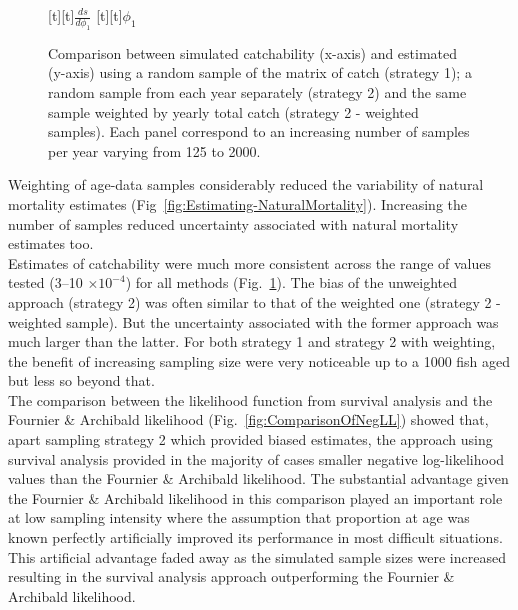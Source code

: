 \documentclass[12pt]{article}
\begin{document}
\begin{figure}
[t][t]{{\protect\large $\displaystyle\frac{ds}{d\phi_1}$}}
[t][t]{{\protect\Large $\phi_1$}}
\centering
{}
\vspace{2cm}
\caption{Comparison between simulated catchability (x-axis) and estimated (y-axis) using a random sample of the matrix of catch (strategy 1); a random sample from each year separately (strategy 2) and the same sample weighted by yearly total catch (strategy 2 - weighted samples). Each panel correspond to an increasing number of samples per year varying from 125 to 2000.}
\label{fig:Estimating-Catchability}
\end{figure}

Weighting of age-data samples considerably reduced the variability of natural mortality estimates (Fig~\ref{fig:Estimating-NaturalMortality}). Increasing the number of samples reduced uncertainty associated with natural mortality estimates too. \\ 

Estimates of catchability were much more consistent across the range of values tested (3--10 $ \times 10^{-4}$) for all methods (Fig.~\ref{fig:Estimating-Catchability}). The bias of the unweighted approach (strategy 2) was often similar to that of the weighted one (strategy 2 - weighted sample). But the uncertainty associated with the former approach was much larger than the latter. For both strategy 1 and strategy 2 with weighting, the benefit of increasing sampling size were very noticeable up to a 1000 fish aged but less so beyond that.\\

The comparison between the likelihood function from survival analysis and the Fournier \& Archibald likelihood (Fig.~\ref{fig:ComparisonOfNegLL}) showed that, apart sampling strategy 2 which provided biased estimates, the approach using survival analysis provided in the majority of cases smaller negative log-likelihood values than the Fournier \& Archibald likelihood. The substantial advantage given the Fournier \& Archibald likelihood in this comparison played an important role at low sampling intensity where the assumption that proportion at age was known perfectly artificially improved its performance in most difficult situations. This artificial advantage faded away as the simulated sample sizes were increased resulting in the survival analysis approach outperforming the Fournier \& Archibald likelihood. \\
\end{document}
